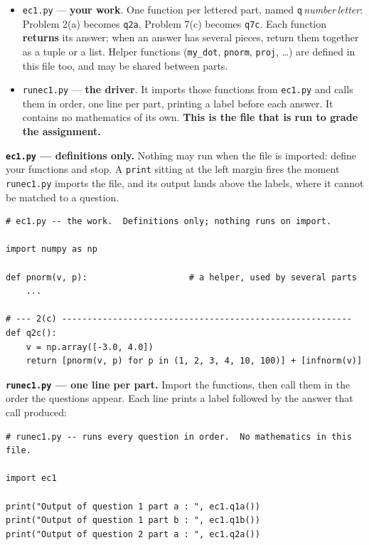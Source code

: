 \documentclass[11pt]{article}
\begin{document}
\begin{itemize}[leftmargin=1.4em,itemsep=6pt,topsep=4pt]
  \item \texttt{ec1.py} --- \textbf{your work}. One function per lettered part,
        named \texttt{q}\,\emph{number}\,\emph{letter}: Problem 2(a) becomes
        \texttt{q2a}, Problem 7(c) becomes \texttt{q7c}. Each function
        \textbf{returns} its answer; when an answer has several pieces, return
        them together as a tuple or a list. Helper functions (\texttt{my\_dot},
        \texttt{pnorm}, \texttt{proj}, \dots) are defined in this file too, and
        may be shared between parts.
  \item \texttt{runec1.py} --- \textbf{the driver}. It imports those functions
        from \texttt{ec1.py} and calls them in order, one line per part,
        printing a label before each answer. It contains no mathematics of its
        own. \textbf{This is the file that is run to grade the assignment.}
\end{itemize}

\medskip
\noindent\textbf{\texttt{ec1.py} --- definitions only.} Nothing may run when the
file is imported: define your functions and stop. A \texttt{print} sitting at the
left margin fires the moment \texttt{runec1.py} imports the file, and its output
lands above the labels, where it cannot be matched to a question.

\begin{lstlisting}
# ec1.py -- the work.  Definitions only; nothing runs on import.

import numpy as np

def pnorm(v, p):                    # a helper, used by several parts
    ...

# --- 2(c) ---------------------------------------------------------
def q2c():
    v = np.array([-3.0, 4.0])
    return [pnorm(v, p) for p in (1, 2, 3, 4, 10, 100)] + [infnorm(v)]
\end{lstlisting}

\noindent\textbf{\texttt{runec1.py} --- one line per part.} Import the functions,
then call them in the order the questions appear. Each line prints a label
followed by the answer that call produced:

\begin{lstlisting}
# runec1.py -- runs every question in order.  No mathematics in this file.

import ec1

print("Output of question 1 part a : ", ec1.q1a())
print("Output of question 1 part b : ", ec1.q1b())
print("Output of question 2 part a : ", ec1.q2a())
\end{lstlisting}
\end{document}
